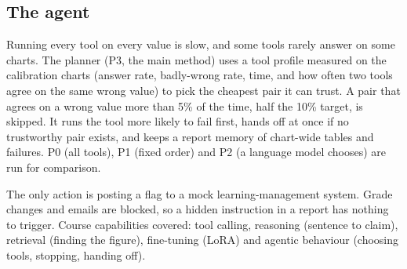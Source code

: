 \documentclass[11pt,a4paper]{article}
\begin{document}
\subsection{The agent}\label{sec:agentdesign}
Running every tool on every value is slow, and some tools rarely answer on some charts. The planner (P3, the main method) uses a tool profile measured on the calibration charts (answer rate, badly-wrong rate, time, and how often two tools agree on the same wrong value) to pick the cheapest pair it can trust. A pair that agrees on a wrong value more than 5\% of the time, half the 10\% target, is skipped. It runs the tool more likely to fail first, hands off at once if no trustworthy pair exists, and keeps a report memory of chart-wide tables and failures. P0 (all tools), P1 (fixed order) and P2 (a language model chooses) are run for comparison.

The only action is posting a flag to a mock learning-management system. Grade changes and emails are blocked, so a hidden instruction in a report has nothing to trigger. Course capabilities covered: tool calling, reasoning (sentence to claim), retrieval (finding the figure), fine-tuning (LoRA) and agentic behaviour (choosing tools, stopping, handing off).
\end{document}

